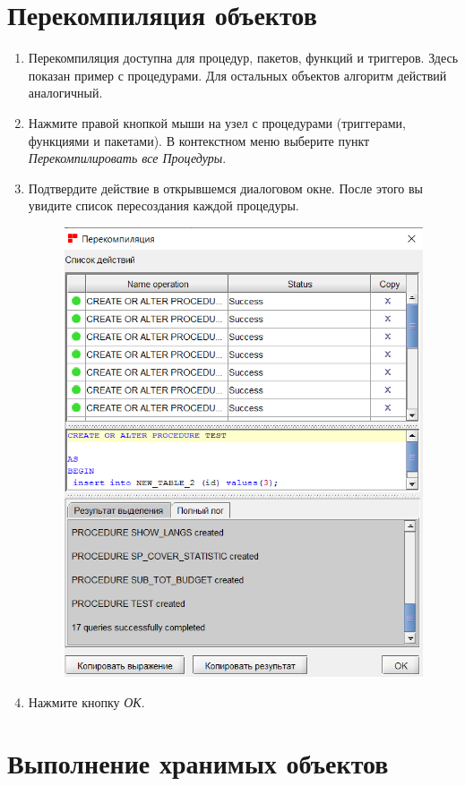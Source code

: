 \section{Перекомпиляция объектов}\label{sec:recompile_objects}
\begin{enumerate}[leftmargin=20pt]
	\item Перекомпиляция доступна для процедур, пакетов, функций и триггеров. Здесь показан пример с процедурами. Для остальных объектов алгоритм действий аналогичный.
	\item Нажмите правой кнопкой мыши на узел с процедурами (триггерами, функциями и пакетами). В контекстном меню выберите пункт \textit{Перекомпилировать все Процедуры}.
	\item Подтвердите действие в открывшемся диалоговом окне. После этого вы увидите список  пересоздания каждой процедуры.
	\begin{figure}[H]
		\centering
		\includegraphics[width = 0.7\linewidth]{img/recompile2.png}
	\end{figure}
	\item Нажмите кнопку \textit{ОК}. 
\end{enumerate}
\newpage
\section{Выполнение хранимых объектов}\label{sec:execute_proc}

